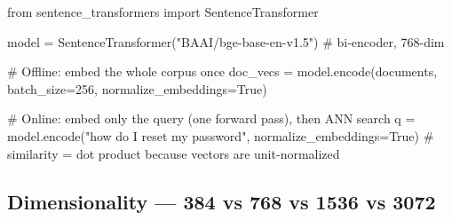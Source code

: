 \documentclass[11pt]{article}
\newenvironment{Shaded}{\begin{snugshade}}{\end{snugshade}}
\newcommand{\CommentTok}[1]{\textcolor[rgb]{0.48,0.49,0.49}{#1}}
\newcommand{\DecValTok}[1]{\textcolor[rgb]{0.96,0.45,0.00}{#1}}
\newcommand{\ImportTok}[1]{\textcolor[rgb]{0.15,0.68,0.38}{#1}}
\newcommand{\NormalTok}[1]{\textcolor[rgb]{0.81,0.81,0.76}{#1}}
\newcommand{\OperatorTok}[1]{\textcolor[rgb]{0.81,0.81,0.76}{#1}}
\newcommand{\StringTok}[1]{\textcolor[rgb]{0.96,0.31,0.31}{#1}}
\newcommand{\VariableTok}[1]{\textcolor[rgb]{0.15,0.68,0.68}{#1}}
\begin{document}
\begin{Shaded}
\begin{Highlighting}[]
\ImportTok{from}\NormalTok{ sentence\_transformers }\ImportTok{import}\NormalTok{ SentenceTransformer}

\NormalTok{model }\OperatorTok{=}\NormalTok{ SentenceTransformer(}\StringTok{"BAAI/bge{-}base{-}en{-}v1.5"}\NormalTok{)  }\CommentTok{\# bi{-}encoder, 768{-}dim}

\CommentTok{\# Offline: embed the whole corpus once}
\NormalTok{doc\_vecs }\OperatorTok{=}\NormalTok{ model.encode(documents, batch\_size}\OperatorTok{=}\DecValTok{256}\NormalTok{, normalize\_embeddings}\OperatorTok{=}\VariableTok{True}\NormalTok{)}

\CommentTok{\# Online: embed only the query (one forward pass), then ANN search}
\NormalTok{q }\OperatorTok{=}\NormalTok{ model.encode(}\StringTok{"how do I reset my password"}\NormalTok{, normalize\_embeddings}\OperatorTok{=}\VariableTok{True}\NormalTok{)}
\CommentTok{\# similarity = dot product because vectors are unit{-}normalized}
\end{Highlighting}
\end{Shaded}

\subsection{Dimensionality --- 384 vs 768 vs 1536 vs 3072}\label{dimensionality--384-vs-768-vs-1536-vs-3072}
\end{document}
